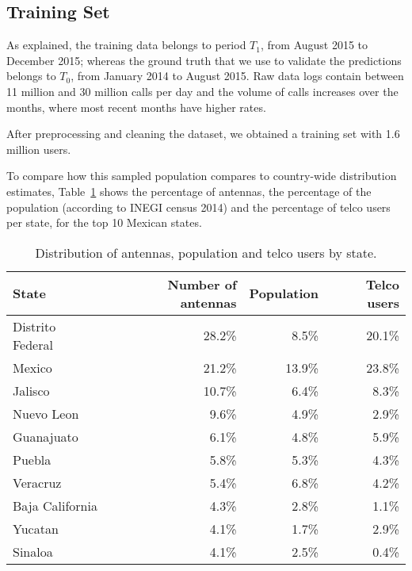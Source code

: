 \subsection{Training Set}

As explained, the training data belongs to period $T_1$, from August 2015 to December 2015;
whereas the ground truth that we use to validate the predictions belongs to $T_0$, from January 2014 to August 2015. Raw data logs contain between 11 million and 30 million calls per day and the volume of calls increases over the months, where most recent months have higher rates.

After preprocessing and cleaning the dataset, we obtained 
a training set with 1.6 million users.

To compare how this sampled population compares to country-wide distribution estimates,
Table~\cref{tab:distribution_by_state} shows the percentage of antennas, the percentage of the population (according to INEGI census 2014) and
the percentage of telco users per state, for the top 10 Mexican states.


\begin{table}[ht]
	\caption{Distribution of antennas, population and telco users by state.}
	\label{tab:distribution_by_state}
	\centering
	\begin{tabular}{l r r r}
		\toprule
		State				& Number of antennas & Population 	& Telco users \\
		\midrule
		Distrito Federal      & 28.2\% 	& 8.5\%		& 20.1\%   \\
		Mexico                     & 21.2\%		&   13.9\% 	& 23.8\%   \\
		Jalisco                   & 10.7\% 	& 6.4\%		& 8.3\%    \\
		Nuevo Leon               & 9.6\%	& 4.9\%		& 2.9\% \\
		Guanajuato               & 6.1\%	& 4.8\%		& 5.9\% \\
		Puebla                     & 5.8\%	& 5.3\%		& 4.3\% \\
		Veracruz                  & 5.4\% 	& 6.8\%		& 4.2\% \\
		Baja California       & 4.3\%	& 2.8\%		& 1.1\% \\
		Yucatan                   & 4.1\%	& 1.7\%		& 2.9\% \\
		Sinaloa                   & 4.1\%	& 2.5\%		& 0.4\% \\
		\bottomrule
	\end{tabular}
\end{table}

